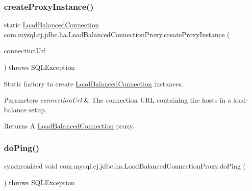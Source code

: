 \subsubsection{\texorpdfstring{create\+Proxy\+Instance()}{createProxyInstance()}}
{\footnotesize\ttfamily static \mbox{\hyperlink{interfacecom_1_1mysql_1_1cj_1_1jdbc_1_1ha_1_1_load_balanced_connection}{Load\+Balanced\+Connection}} com.\+mysql.\+cj.\+jdbc.\+ha.\+Load\+Balanced\+Connection\+Proxy.\+create\+Proxy\+Instance (\begin{DoxyParamCaption}\item[{\mbox{\hyperlink{classcom_1_1mysql_1_1cj_1_1conf_1_1url_1_1_loadbalance_connection_url}{Loadbalance\+Connection\+Url}}}]{connection\+Url }\end{DoxyParamCaption}) throws S\+Q\+L\+Exception\hspace{0.3cm}{\ttfamily [static]}}

Static factory to create \mbox{\hyperlink{interfacecom_1_1mysql_1_1cj_1_1jdbc_1_1ha_1_1_load_balanced_connection}{Load\+Balanced\+Connection}} instances.


\begin{DoxyParams}{Parameters}
{\em connection\+Url} & The connection U\+RL containing the hosts in a load-\/balance setup. \\
\hline
\end{DoxyParams}
\begin{DoxyReturn}{Returns}
A \mbox{\hyperlink{interfacecom_1_1mysql_1_1cj_1_1jdbc_1_1ha_1_1_load_balanced_connection}{Load\+Balanced\+Connection}} proxy. 
\end{DoxyReturn}
\mbox{\label{classcom_1_1mysql_1_1cj_1_1jdbc_1_1ha_1_1_load_balanced_connection_proxy_a735361812f6c57f687ad6512e4bd3809}} 
\subsubsection{\texorpdfstring{do\+Ping()}{doPing()}}
{\footnotesize\ttfamily synchronized void com.\+mysql.\+cj.\+jdbc.\+ha.\+Load\+Balanced\+Connection\+Proxy.\+do\+Ping (\begin{DoxyParamCaption}{ }\end{DoxyParamCaption}) throws S\+Q\+L\+Exception}

